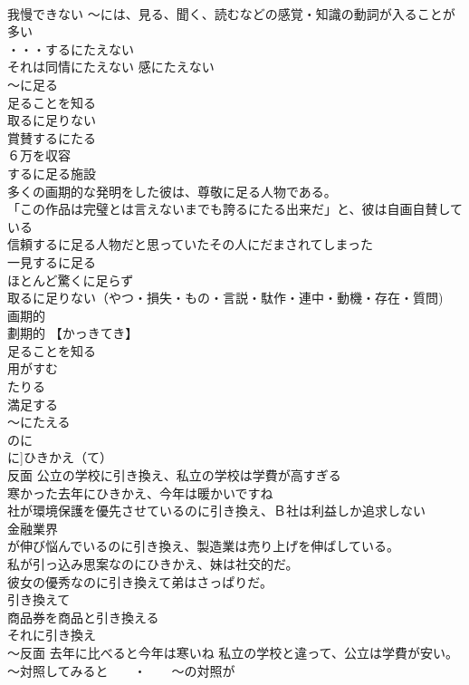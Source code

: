 \documentclass[8pt]{extreport}
\begin{document}
\begin{CJK}{UTF8}{min}
\\	我慢できない ～には、見る、聞く、読むなどの感覚・知識の動詞が入ることが多い 
\\	・・・するにたえない 
\\	それは同情にたえない 感にたえない 
\\	～に足る 
\\	足ることを知る 
\\	取るに足りない	
\\	賞賛するにたる 
\\	６万を収容
\\	するに足る施設 
\\	多くの画期的な発明をした彼は、尊敬に足る人物である。 
\\	「この作品は完璧とは言えないまでも誇るにたる出来だ」と、彼は自画自賛している
\\	信頼するに足る人物だと思っていたその人にだまされてしまった 
\\	一見するに足る　　
\\	ほとんど驚くに足らず 
\\	取るに足りない（やつ・損失・もの・言説・駄作・連中・動機・存在・質問) 
\\	画期的
\\	劃期的 【かっきてき】 
\\	足ることを知る 
\\	用がすむ 
\\	たりる 
\\	満足する 
\\	～にたえる 
\\	のに 
\\	に]ひきかえ（て）	
\\	反面	公立の学校に引き換え、私立の学校は学費が高すぎる 
\\	寒かった去年にひきかえ、今年は暖かいですね 
\\	社が環境保護を優先させているのに引き換え、Ｂ社は利益しか追求しない 
\\	金融業界
\\	が伸び悩んでいるのに引き換え、製造業は売り上げを伸ばしている。 
\\	私が引っ込み思案なのにひきかえ、妹は社交的だ。
\\	彼女の優秀なのに引き換えて弟はさっぱりだ。 
\\	引き換えて 
\\	商品券を商品と引き換える 
\\	それに引き換え 
\\	～反面 去年に比べると今年は寒いね 私立の学校と違って、公立は学費が安い。 ～対照してみると　　・　　～の対照が

\end{CJK}
\end{document}
